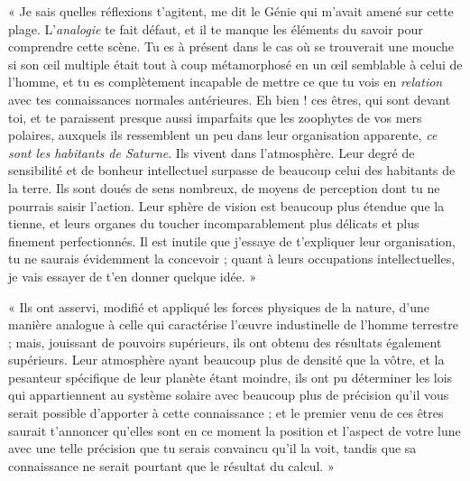 \documentclass[a4paper, 11pt, oneside, landscape]{article}
\begin{document}
« Je sais quelles réflexions t'agitent, me dit le Génie qui m'avait amené sur cette plage. L'\emph{analogie} te fait défaut, et il te manque les éléments du savoir pour comprendre cette scène. Tu es à présent dans le cas où se trouverait une mouche si son œil multiple était tout à coup métamorphosé en un œil semblable à celui de l'homme, et tu es complètement incapable de mettre ce que tu vois en \emph{relation} avec tes connaissances normales antérieures. Eh bien ! ces êtres, qui sont devant toi, et te paraissent presque aussi imparfaits que les zoophytes de vos mers polaires, auxquels ils ressemblent un peu dans leur organisation apparente, \emph{ce sont les habitants de Saturne}. Ils vivent dans l'atmosphère. Leur degré de sensibilité et de bonheur intellectuel surpasse de beaucoup celui des habitants de la terre. Ils sont doués de sens nombreux, de moyens de perception dont tu ne pourrais saisir l'action. Leur sphère de vision est beaucoup plus étendue que la tienne, et leurs organes du toucher incomparablement plus délicats et plus finement perfectionnés. Il est inutile que j'essaye de t'expliquer leur organisation, tu ne saurais évidemment la concevoir ; quant à leurs occupations intellectuelles, je vais essayer de t'en donner quelque idée. »

« Ils ont asservi, modifié et appliqué les forces physiques de la nature, d'une manière analogue à celle qui caractérise l'œuvre industinelle de l'homme terrestre ; mais, jouissant de pouvoirs supérieurs, ils ont obtenu des résultats également supérieurs. Leur atmosphère ayant beaucoup plus de densité que la vôtre, et la pesanteur spécifique de leur planète étant moindre, ils ont pu déterminer les lois qui appartiennent au système solaire avec beaucoup plus de précision qu'il vous serait possible d'apporter à cette connaissance ; et le premier venu de ces êtres saurait t'annoncer qu'elles sont en ce moment la position et l'aspect de votre lune avec une telle précision que tu serais convaincu qu'il la voit, tandis que sa connaissance ne serait pourtant que le résultat du calcul. »
\end{document}
